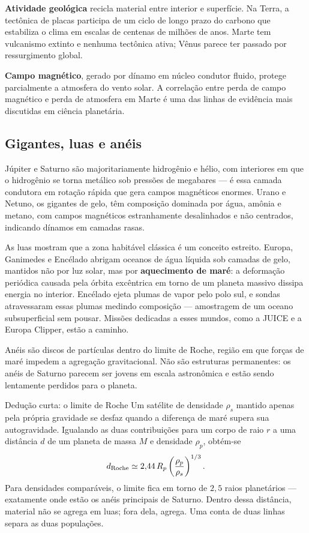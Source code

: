 \documentclass[11pt,a4paper]{article}
\begin{document}
\textbf{Atividade geológica} recicla material entre interior e superfície. Na Terra, a tectônica de placas participa de um ciclo de longo prazo do carbono que estabiliza o clima em escalas de centenas de milhões de anos. Marte tem vulcanismo extinto e nenhuma tectônica ativa; Vênus parece ter passado por ressurgimento global.

\textbf{Campo magnético}, gerado por dínamo em núcleo condutor fluido, protege parcialmente a atmosfera do vento solar. A correlação entre perda de campo magnético e perda de atmosfera em Marte é uma das linhas de evidência mais discutidas em ciência planetária.

\subsection*{Gigantes, luas e anéis}

Júpiter e Saturno são majoritariamente hidrogênio e hélio, com interiores em que o hidrogênio se torna metálico sob pressões de megabares --- é essa camada condutora em rotação rápida que gera campos magnéticos enormes. Urano e Netuno, os gigantes de gelo, têm composição dominada por água, amônia e metano, com campos magnéticos estranhamente desalinhados e não centrados, indicando dínamos em camadas rasas.

As luas mostram que a zona habitável clássica é um conceito estreito. Europa, Ganimedes e Encélado abrigam oceanos de água líquida sob camadas de gelo, mantidos não por luz solar, mas por \textbf{aquecimento de maré}: a deformação periódica causada pela órbita excêntrica em torno de um planeta massivo dissipa energia no interior. Encélado ejeta plumas de vapor pelo polo sul, e sondas atravessaram essas plumas medindo composição --- amostragem de um oceano subsuperficial sem pousar. Missões dedicadas a esses mundos, como a JUICE e a Europa Clipper, estão a caminho.

Anéis são discos de partículas dentro do limite de Roche, região em que forças de maré impedem a agregação gravitacional. Não são estruturas permanentes: os anéis de Saturno parecem ser jovens em escala astronômica e estão sendo lentamente perdidos para o planeta.

\begin{lessonblock}[borderline west={2pt}{0pt}{astroGold}]{Dedução curta: o limite de Roche}
Um satélite de densidade $\rho_s$ mantido apenas pela própria gravidade se desfaz quando a diferença de maré supera sua autogravidade. Igualando as duas contribuições para um corpo de raio $r$ a uma distância $d$ de um planeta de massa $M$ e densidade $\rho_p$, obtém-se
\[
d_{\rm Roche}\simeq2{,}44\,R_p\left(\frac{\rho_p}{\rho_s}\right)^{1/3}.
\]
Para densidades comparáveis, o limite fica em torno de $2{,}5$ raios planetários --- exatamente onde estão os anéis principais de Saturno. Dentro dessa distância, material não se agrega em luas; fora dela, agrega. Uma conta de duas linhas separa as duas populações.
\end{lessonblock}
\end{document}
